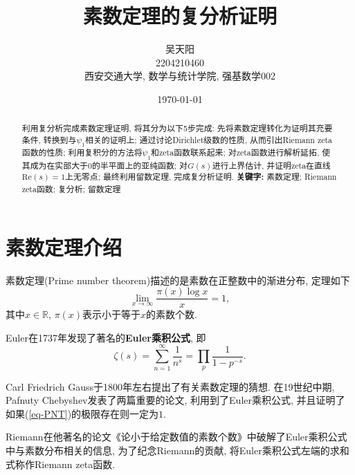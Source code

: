 \documentclass[12pt, a4paper, oneside]{ctexart}
\numberwithin{equation}{section}  %
\def\R{\mathbb{R}}          %
\def\re{\mathrm{Re}}        %
\def\add{\vspace{1ex}}      %
\begin{document}
\title{素数定理的复分析证明}
\author{
吴天阳\\[1ex]
2204210460\\[1ex]
西安交通大学, 数学与统计学院, 强基数学002\\[1ex]
}
\date{\today}

\maketitle %

\begin{abstract}
    利用复分析完成素数定理证明, 将其分为以下5步完成: 先将素数定理转化为证明其充要条件, 转换到与$\psi_1$相关的证明上; 通过讨论Dirichlet级数的性质, 从而引出Riemann zeta函数的性质; 利用复积分的方法将$\psi_1$和zeta函数联系起来; 对zeta函数进行解析延拓, 使其成为在实部大于$0$的半平面上的亚纯函数; 对$G(s)$进行上界估计, 并证明zeta在直线$\re(s)=1$上无零点; 最终利用留数定理, 完成复分析证明.
    \add\add
    \textbf{关键字: }素数定理; Riemann zeta函数; 复分析; 留数定理
\end{abstract}
\clearpage %
\tableofcontents %

\clearpage

\section{素数定理介绍}
素数定理(Prime number theorem)描述的是素数在正整数中的渐进分布, 定理如下
\begin{equation}\label{eq-PNT}
    \lim_{x\to\infty}\frac{\pi(x)\log x}{x} = 1,
\end{equation}
其中$x\in \R$, $\pi(x)$表示小于等于$x$的素数个数.

Euler在1737年发现了著名的\textbf{Euler乘积公式}, 即
\begin{equation*}
    \zeta(s) = \sum_{n=1}^\infty\frac{1}{n^s} = \prod_p\frac{1}{1-p^{-s}}.
\end{equation*}

Carl Friedrich Gauss于1800年左右提出了有关素数定理的猜想. 在19世纪中期, Pafnuty Chebyshev发表了两篇重要的论文, 利用到了Euler乘积公式, 并且证明了如果(\ref{eq-PNT})的极限存在则一定为$1$.

Riemann在他著名的论文《论小于给定数值的素数个数》中破解了Euler乘积公式中与素数分布相关的信息, 为了纪念Riemann的贡献, 将Euler乘积公式左端的求和式称作Riemann zeta函数.
\end{document}
